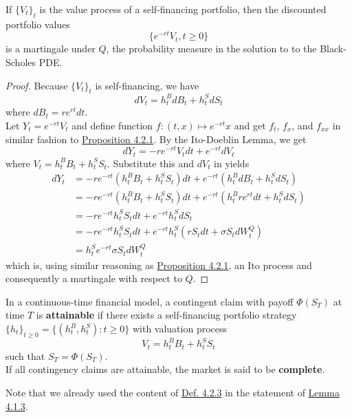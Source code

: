 \documentclass[11pt,fleqn]{book} %
\begin{document}
\begin{proposition} \label{prop:422}
If \(\{V_t\}_t\) is the value process of a self-financing portfolio, then the discounted portfolio values
\[
\{e^{-rt}V_t, t \geq 0\}
\]
is a martingale under \(Q\), the probability measure in the solution to to the Black-Scholes PDE.
\end{proposition}
\begin{proof}
Because \(\{V_t\}_t\) is self-financing, we have
\[
dV_t = h_t^BdB_t + h_t^SdS_t
\]
where \(dB_t = re^{rt}dt\). \\
\indent Let \(Y_t = e^{-rt}V_t\) and define function \(f:(t, x) \mapsto e^{-rt}x\) and get \(f_t\), \(f_x\), and \(f_{xx}\) in similar fashion to \hyperref[prop:421]{Proposition 4.2.1}. By the Ito-Doeblin Lemma, we get
\[
dY_t = -re^{-rt}V_tdt + e^{-rt}dV_t
\]
where \(V_t = h_t^BB_t + h_t^SS_t\). Substitute this and \(dV_t\) in yields
\[
\begin{aligned}
dY_t &= -re^{-rt}(h_t^BB_t + h_t^SS_t)dt + e^{-rt}(h_t^BdB_t + h_t^SdS_t) \\
&= -re^{-rt}(h_t^BB_t + h_t^SS_t)dt + e^{-rt}(h_t^Bre^{rt}dt + h_t^SdS_t) \\
&= -re^{-rt}h_t^SS_tdt + e^{-rt}h_t^SdS_t \\
&= -re^{-rt}h_t^SS_tdt + e^{-rt}h_t^S(rS_tdt + \sigma S_tdW_t^Q) \\
&= h_t^Se^{-rt}\sigma S_tdW_t^Q
\end{aligned}
\]
which is, using similar reasoning as \hyperref[prop:421]{Proposition 4.2.1}, an Ito process and consequently a martingale with respect to \(Q\).
\end{proof}

\begin{definition} \label{def:423}
In a continuous-time financial model, a contingent claim with payoff \(\Phi(S_T)\) at time \(T\) is \textbf{attainable} if there exists a self-financing portfolio strategy \(\{h_t\}_{t \geq 0} = \{(h_t^B, h_t^S): t \geq 0\}\) with valuation process
\[
V_t = h_t^BB_t + h_t^SS_t
\]
such that \(S_T = \Phi(S_T)\). \\
\indent If all contingency claims are attainable, the market is said to be \textbf{complete}.
\end{definition}

\begin{remark} \label{rmk:424}
Note that we already used the content of \hyperref[def:423]{Def. 4.2.3} in the statement of \hyperref[lemma:413]{Lemma 4.1.3}.
\end{remark}
\end{document}
